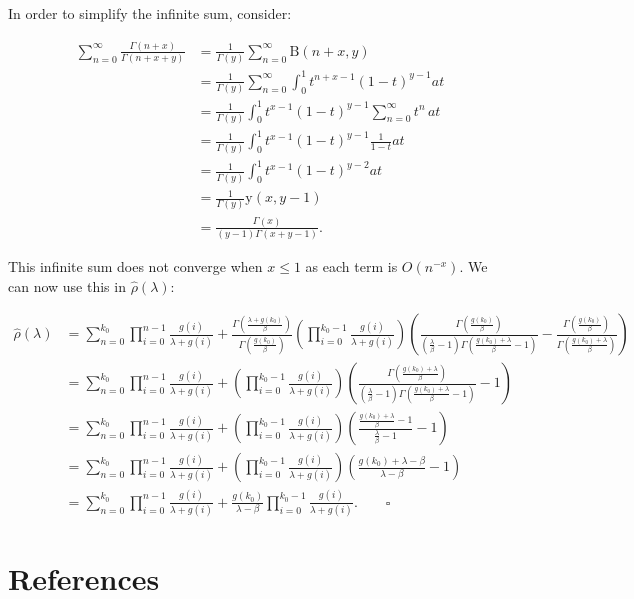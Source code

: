 \documentclass[
  sn-basic,
]{sn-jnl}
\theoremstyle{plain}
\theoremstyle{plain}
\theoremstyle{remark}
\begin{document}
In order to simplify the infinite sum, consider:

\begin{align*}
\sum_{n=0}^\infty\frac{\Gamma(n+x)}{\Gamma(n+x+y)} &=\frac{1}{\Gamma(y)}\sum_{n=0}^\infty \text{B}(n+x,y)\\
&=\frac{1}{\Gamma(y)}\sum_{n=0}^\infty\int_0^1t^{n+x-1}(1-t)^{y-1}at\\
&=\frac{1}{\Gamma(y)}\int_0^1 t^{x-1}(1-t)^{y-1}\sum_{n=0}^\infty t^n\,at\\
&=\frac{1}{\Gamma(y)}\int_0^1 t^{x-1}(1-t)^{y-1}\frac{1}{1-t}at\\
&=\frac{1}{\Gamma(y)}\int_0^1 t^{x-1}(1-t)^{y-2}at\\
&=\frac{1}{\Gamma(y)}\text{y}(x,y-1)\\
&= \frac{\Gamma(x)}{(y-1)\Gamma(x+y-1)}.
\end{align*}

This infinite sum does not converge when \(x\le1\) as each term is
\(O(n^{-x})\). We can now use this in \(\hat\rho(\lambda)\):

\begin{align*}
\hat\rho(\lambda) &= \sum_{n=0}^{k_0}\prod_{i=0}^{n-1}\frac{g(i)}{\lambda+g(i)} + \frac{\Gamma\left(\frac{\lambda+g(k_0)}{\beta}\right)}{\Gamma\left(\frac{g(k_0)}{\beta}\right)}\left(\prod_{i=0}^{k_0-1}\frac{g(i)}{\lambda+g(i)}\right)\left(\frac{\Gamma\left(\frac{g(k_0)}{\beta}\right)}{\left(\frac{\lambda}{\beta}-1\right)\Gamma\left(\frac{g(k_0)+\lambda}{\beta}-1\right)}-\frac{\Gamma\left(\frac{g(k_0)}{\beta}\right)}{\Gamma\left(\frac{g(k_0)+\lambda}{\beta}\right)}\right)\\
&=\sum_{n=0}^{k_0}\prod_{i=0}^{n-1}\frac{g(i)}{\lambda+g(i)} + \left(\prod_{i=0}^{k_0-1}\frac{g(i)}{\lambda+g(i)}\right)\left(\frac{\Gamma\left(\frac{g(k_0)+\lambda}{\beta}\right)}{\left(\frac{\lambda}{\beta}-1\right)\Gamma\left(\frac{g(k_0)+\lambda}{\beta}-1\right)}-1\right)\\
&=\sum_{n=0}^{k_0}\prod_{i=0}^{n-1}\frac{g(i)}{\lambda+g(i)} + \left(\prod_{i=0}^{k_0-1}\frac{g(i)}{\lambda+g(i)}\right)\left(\frac{\frac{g(k_0)+\lambda}{\beta}-1}{\frac{\lambda}{\beta}-1}-1\right)\\
&=\sum_{n=0}^{k_0}\prod_{i=0}^{n-1}\frac{g(i)}{\lambda+g(i)} + \left(\prod_{i=0}^{k_0-1}\frac{g(i)}{\lambda+g(i)}\right)\left(\frac{g(k_0)+\lambda-\beta}{\lambda-\beta}-1\right)\\&=\sum_{n=0}^{k_0}\prod_{i=0}^{n-1}\frac{g(i)}{\lambda+g(i)} + \frac{g(k_0)}{\lambda-\beta}\prod_{i=0}^{k_0-1}\frac{g(i)}{\lambda+g(i)}.\qquad \square
\end{align*}

\newpage

\section*{References}\label{references}

\renewcommand{\bibsection}{}

\end{document}

